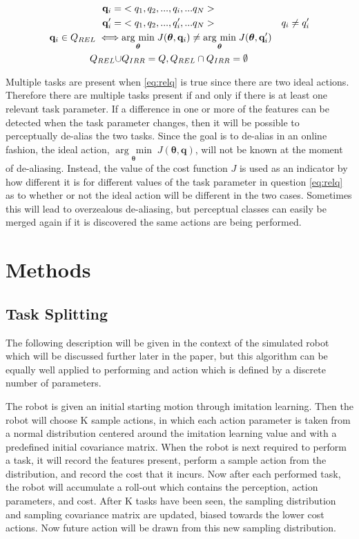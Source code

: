 \documentclass[12pt]{article}
\newcommand{\taskp}  {\ensuremath{\mathbf{q}}}
\newcommand{\taskpv} {\ensuremath{q}}
\newcommand{\costf}  {\ensuremath{J}}
\newcommand{\app}    {\ensuremath{\bm{\theta}}}
\newcommand{\taskpsp}{\ensuremath{Q}}
\newcommand{\argmin}[1]{\underset{#1}{\operatorname{arg}\,\operatorname{min}}\;}
\begin{document}
\begin{align}
\taskp_i =& <\taskpv_1,\taskpv_2,...,\taskpv_i,...\taskpv_N> \notag & 
\\
\taskp'_i =& <\taskpv_1,\taskpv_2,...,\taskpv'_i,...\taskpv_N> \notag & \taskpv_i \neq \taskpv'_i \\
\label{eq:relq} \taskp_i \in \taskpsp_{REL} \iff&\argmin{\app}\costf(\app,\taskp_i) \neq \argmin{\app}\costf(\app,\taskp'_i)\\
\taskpsp_{REL} \cup & \taskpsp_{IRR} = \taskpsp,   \taskpsp_{REL} \cap \taskpsp_{IRR} = \emptyset 
\end{align}

Multiple tasks are present when \eqref{eq:relq} is true since there are two ideal actions. Therefore there are multiple tasks present if and only if there is at least one relevant task parameter. If a difference in one or more of the features can be detected when the task parameter changes, then it will be possible to perceptually de-alias the two tasks. Since the goal is to de-alias in an online fashion, the ideal action, $\argmin{\app}\costf(\app,\taskp)$, will not be known at the moment of de-aliasing. Instead, the value of the cost function $\costf$ is used as an indicator by how different it is for different values of the task parameter in question \eqref{eq:relq} as to whether or not the ideal action will be different in the two cases. Sometimes this will lead to overzealous de-aliasing, but perceptual classes can easily be merged again if it is discovered the same actions are being performed.

\section{Methods}

\subsection{Task Splitting}
The following description will be given in the context of the simulated robot which will be discussed further later in the paper, but this algorithm can be equally well applied to performing and action which is defined by a discrete number of parameters. 

The robot is given an initial starting motion through imitation learning. Then the robot will choose K sample actions, in which each action parameter is taken from a normal distribution centered around the imitation learning value and with a predefined initial covariance matrix. When the robot is next required to perform a task, it will record the features present, perform a sample action from the distribution, and record the cost that it incurs. Now after each performed task, the robot will accumulate a roll-out which contains the perception, action parameters, and cost. After K tasks have been seen, the sampling distribution and sampling covariance matrix are updated, biased towards the lower cost actions. Now future action will be drawn from this new sampling distribution. 
\end{document}
